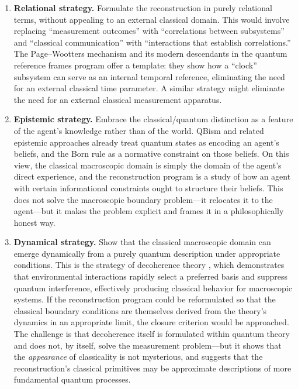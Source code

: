 \documentclass[12pt,a4paper,twoside]{article}
\begin{document}
\begin{enumerate}
\item \textbf{Relational strategy.} Formulate the reconstruction in purely relational terms, without appealing to an external classical domain. This would involve replacing ``measurement outcomes'' with ``correlations between subsystems'' and ``classical communication'' with ``interactions that establish correlations.'' The Page--Wootters mechanism \cite{PageWootters1983} and its modern descendants in the quantum reference frames program \cite{Giacomini2019,delaHamette2021} offer a template: they show how a ``clock'' subsystem can serve as an internal temporal reference, eliminating the need for an external classical time parameter. A similar strategy might eliminate the need for an external classical measurement apparatus.

\item \textbf{Epistemic strategy.} Embrace the classical/quantum distinction as a feature of the agent's knowledge rather than of the world. QBism \cite{Fuchs2010} and related epistemic approaches already treat quantum states as encoding an agent's beliefs, and the Born rule as a normative constraint on those beliefs. On this view, the classical macroscopic domain is simply the domain of the agent's direct experience, and the reconstruction program is a study of how an agent with certain informational constraints ought to structure their beliefs. This does not solve the macroscopic boundary problem---it relocates it to the agent---but it makes the problem explicit and frames it in a philosophically honest way.

\item \textbf{Dynamical strategy.} Show that the classical macroscopic domain can emerge dynamically from a purely quantum description under appropriate conditions. This is the strategy of decoherence theory \cite{Zurek2003,Schlosshauer2007}, which demonstrates that environmental interactions rapidly select a preferred basis and suppress quantum interference, effectively producing classical behavior for macroscopic systems. If the reconstruction program could be reformulated so that the classical boundary conditions are themselves derived from the theory's dynamics in an appropriate limit, the closure criterion would be approached. The challenge is that decoherence itself is formulated within quantum theory and does not, by itself, solve the measurement problem---but it shows that the \emph{appearance} of classicality is not mysterious, and suggests that the reconstruction's classical primitives may be approximate descriptions of more fundamental quantum processes.
\end{enumerate}
\end{document}
